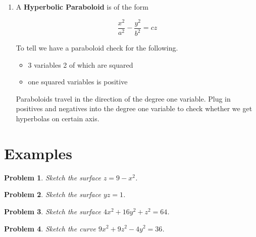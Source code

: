 \documentclass[11pt]{article}
\newtheorem{problem}{Problem}
\begin{document}
\begin{enumerate}
Paraboloids travel in the direction of the degree one variable and opens in the direction depending on the variable $c$ (positive or negative). To graph set the degree one variable equal to 0 (unless shifted).

\item A \textbf{Hyperbolic Paraboloid} is of the form

\begin{equation*}
    \frac{x^2}{a^2}-\frac{y^2}{b^2}=cz
\end{equation*}

To tell we have a paraboloid check for the following.

\begin{itemize}
    \item 3 variables 2 of which are squared
    \item one squared variables is positive
\end{itemize}

Paraboloids travel in the direction of the degree one variable. Plug in positives and negatives into the degree one variable to check whether we get hyperbolas on certain axis.

\end{enumerate}




\section{Examples}

\begin{problem}
    Sketch the surface $z = 9-x^2$.
\end{problem}

\vspace{7cm}

\begin{problem}
    Sketch the surface $yz=1$.
\end{problem}

\vspace{5cm}


\begin{problem}
    Sketch the surface $4x^2+16y^2+z^2=64$.
\end{problem}

\vspace{7cm}

\begin{problem}
    Sketch the curve $9x^2+9z^2-4y^2=36$.
\end{problem}
\end{document}
